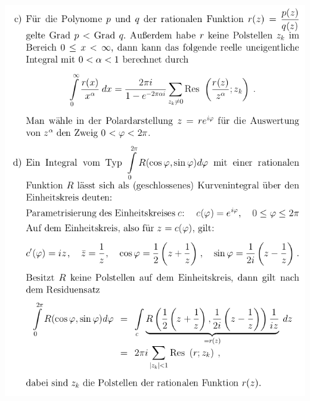 \documentclass[10pt,a4paper]{article}
\begin{document}
\includegraphics[scale=0.5]{kalk2}
\end{document}
